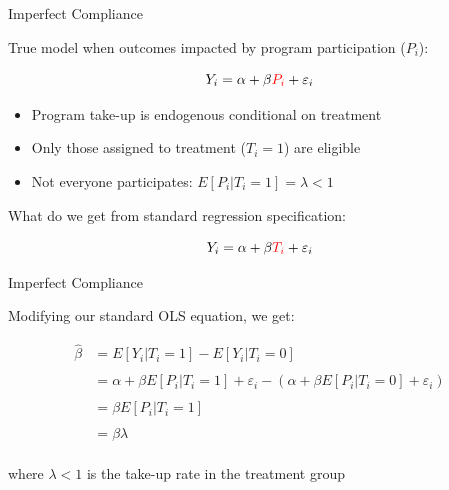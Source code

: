 \documentclass[10pt,xcolor=table,ignorenonframetext,aspectratio=169]{beamer}
\newlength{\wideitemsep}
\let\olditem\item
\renewcommand{\item}{\setlength{\itemsep}{\wideitemsep}\olditem}
\begin{document}
\begin{frame}{Imperfect Compliance}

\medskip
True model when outcomes impacted by program participation ($P_i$):

\begin{small}
	\begin{equation*}
	Y_i = \alpha + \beta \textcolor{red}{P_i} + \varepsilon_i
	\end{equation*}
\end{small}


\begin{itemize}
	
	\item Program take-up is endogenous conditional on treatment
	
	\item Only those assigned to treatment ($T_i = 1$) are eligible
	
	\item Not everyone participates:  $E [ P_i | T_i  = 1 ] = \lambda < 1$
	
\end{itemize}

\pause
\medskip
\medskip
What do we get from standard regression specification:
\begin{small}
	\begin{equation*}
	Y_i = \alpha + \beta \textcolor{red}{T_i} + \varepsilon_i
	\end{equation*}
\end{small}


\end{frame}



\begin{frame}{Imperfect Compliance}

\medskip
Modifying our standard OLS equation, we get:

\medskip
\begin{small}
	\begin{equation*}
	\begin{split}
	\hat{\beta} &= E \left[ Y_i \vert T_i = 1 \right] - E \left[ Y_i \vert T_i = 0 \right] \\
	& \\
	&= \alpha + \beta E \left[ P_i \vert T_i = 1 \right] + \varepsilon_i 
	- \left( \alpha + \beta  E \left[ P_i \vert T_i = 0 \right] + \varepsilon_i  \right) \\
	& \\
	&= \beta E \left[ P_i \vert T_i = 1 \right]  \\
	& \\
	&= \beta \lambda  \\
	\end{split}
	\end{equation*}
\end{small}

where $\lambda<1$ is the take-up rate in the treatment group

\medskip
\medskip
{}

\end{frame}
\end{document}
